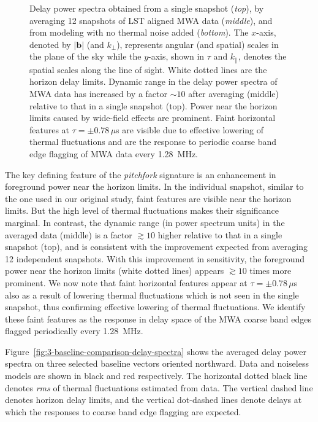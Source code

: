 \documentclass[preprint2,apjl,numberedappendix,twocolappendix,appendixfloats]{emulateapj}
\begin{document}
\begin{figure}[htb]
\caption{Delay power spectra obtained from a single snapshot ({\it top}), by averaging 12 snapshots of LST aligned MWA data ({\it middle}), and from modeling with no thermal noise added ({\it bottom}). The $x$-axis, denoted by $|\boldsymbol{b}|$ (and $k_\perp$), represents angular (and spatial) scales in the plane of the sky while the $y$-axis, shown in $\tau$ and $k_\parallel$, denotes the spatial scales along the line of sight. White dotted lines are the horizon delay limits. Dynamic range in the delay power spectra of MWA data has increased by a factor $\sim 10$ after averaging (middle) relative to that in a single snapshot (top). Power near the horizon limits caused by wide-field effects are prominent. Faint horizontal features at $\tau=\pm 0.78\,\mu$s are visible due to effective lowering of thermal fluctuations and are the response to periodic coarse band edge flagging of MWA data every 1.28~MHz. \label{fig:delay-spectra}}
\end{figure}

The key defining feature of the {\it pitchfork} signature is an enhancement in foreground power near the horizon limits. In the individual snapshot, similar to the one used in our original study, faint features are visible near the horizon limits. But the high level of thermal fluctuations makes their significance marginal. In contrast, the dynamic range (in power spectrum units) in the averaged data (middle) is a factor $\gtrsim 10$ higher relative to that in a single snapshot (top), and is consistent with the improvement expected from averaging 12 independent snapshots. With this improvement in sensitivity, the foreground power near the horizon limits (white dotted lines) appears $\gtrsim 10$ times more prominent. We now note that faint horizontal features appear at $\tau = \pm 0.78\,\mu$s also as a result of lowering thermal fluctuations which is not seen in the single snapshot, thus confirming effective lowering of thermal fluctuations. We identify these faint features as the response in delay space of the MWA coarse band edges flagged periodically every 1.28~MHz. 

Figure~\ref{fig:3-baseline-comparison-delay-spectra} shows the averaged delay power spectra on three selected baseline vectors oriented northward. Data and noiseless models are shown in black and red respectively. The horizontal dotted black line denotes {\it rms} of thermal fluctuations estimated from data. The vertical dashed line denotes horizon delay limits, and the vertical dot-dashed lines denote delays at which the responses to coarse band edge flagging are expected.
\end{document}
